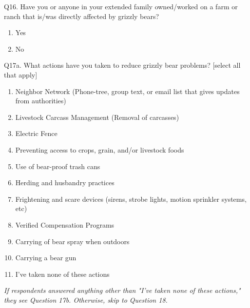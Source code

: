 \documentclass[english,12pt]{article}
\begin{document}
Q16. Have you or anyone in your extended family owned/worked on a farm or ranch that is/was directly affected by grizzly bears?
\begin{enumerate}
    \item[a.] Yes
    \item[b.] No
\end{enumerate}
\newpage
Q17a. What actions have you taken to reduce grizzly bear problems? [select all that apply]
\begin{enumerate}
    \item[a.] Neighbor Network (Phone-tree, group text, or email list that gives updates from authorities)
    \item[b.] Livestock Carcass Management (Removal of carcasses)
    \item[c.] Electric Fence
    \item[d.] Preventing access to crops, grain, and/or livestock foods
    \item[e.] Use of bear-proof trash cans
    \item[f.] Herding and husbandry practices
    \item[g.] Frightening and scare devices (sirens, strobe lights, motion sprinkler systems, etc)
    \item[h.] Verified Compensation Programs
    \item[i.] Carrying of bear spray when outdoors
    \item[j.] Carrying a bear gun
    \item[k.] I've taken none of these actions
\end{enumerate}
\newpage
\textit{If respondents answered anything other than "I've taken none of these actions," they see Question 17b. Otherwise, skip to Question 18.}
\end{document}
